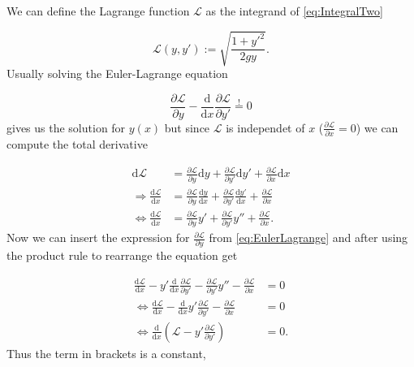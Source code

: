 \documentclass[12pt,a4paper]{exam}
\begin{document}
  We can define the Lagrange function $\mathcal{L}$ as the integrand of \eqref{eq:IntegralTwo} 
  
    \begin{equation}
      \mathcal{L}\left(y, y'\right) := \sqrt{\frac{1 + y'^2}{2gy}} \label{eq:Lagrangian}.
    \end{equation}
  Usually solving the Euler-Lagrange equation
  
    \begin{equation}
      \frac{\partial \mathcal{L}}{\partial y} - \frac{\text{d}}{\text{d} x} \frac{\partial \mathcal{L}}{\partial y'} \overset{!}{=} 0 \label{eq:EulerLagrange}
    \end{equation}
  gives us the solution for $y(x)$ but since $\mathcal{L}$ is independet of $x$ ($\frac{\partial \mathcal{L}}{\partial x} = 0$) we can compute the total derivative 
  
    \begin{equation}
      \begin{split}
        \text{d} \mathcal{L} &= \frac{\partial \mathcal{L}}{\partial y} \text{d} y + \frac{\partial \mathcal{L}}{\partial y'} \text{d} y' + \frac{\partial \mathcal{L}}{\partial x} \text{d} x \\
        \Rightarrow \frac{\text{d} \mathcal{L}}{\text{d} x} &= \frac{\partial \mathcal{L}}{\partial y} \frac{\text{d} y}{\text{d} x} + \frac{\partial \mathcal{L}}{\partial y'} \frac{\text{d} y'}{\text{d} x} + \frac{\partial \mathcal{L}}{\partial x} \\
        \Leftrightarrow \frac{\text{d} \mathcal{L}}{\text{d} x} &= \frac{\partial \mathcal{L}}{\partial y} y' + \frac{\partial \mathcal{L}}{\partial y'} y'' + \frac{\partial \mathcal{L}}{\partial x}.
      \end{split}
    \end{equation}
  Now we can insert the expression for $\frac{\partial \mathcal{L}}{\partial y}$ from \eqref{eq:EulerLagrange} and after using the product rule to rearrange the equation get
  
    \begin{equation}
      \begin{split}
        \frac{\text{d} \mathcal{L}}{\text{d} x} - y' \frac{\text{d}}{\text{d} x} \frac{\partial \mathcal{L}}{\partial y'}  - \frac{\partial \mathcal{L}}{\partial y'} y'' - \frac{\partial \mathcal{L}}{\partial x} &= 0 \\
        \Leftrightarrow \frac{\text{d} \mathcal{L}}{\text{d} x} -  \frac{\text{d}}{\text{d} x} y' \frac{\partial \mathcal{L}}{\partial y'} - \frac{\partial \mathcal{L}}{\partial x} &= 0 \\
        \Leftrightarrow \frac{\text{d} }{\text{d} x} \left(\mathcal{L} -   y' \frac{\partial \mathcal{L}}{\partial y'}\right) &= 0.
      \end{split}
    \end{equation}
  Thus the term in brackets is a constant,
  
\end{document}
